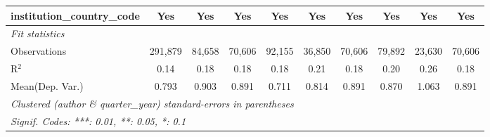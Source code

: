 \begin{tabular}{lccccccccc}
   institution\_country\_code             & Yes           & Yes           & Yes           & Yes           & Yes           & Yes           & Yes           & Yes           & Yes\\  
   \midrule
   \emph{Fit statistics}\\
   Observations                           & 291,879       & 84,658        & 70,606        & 92,155        & 36,850        & 70,606        & 79,892        & 23,630        & 70,606\\  
   R$^2$                                  & 0.14          & 0.18          & 0.18          & 0.18          & 0.21          & 0.18          & 0.20          & 0.26          & 0.18\\  
Mean(Dep. Var.) & 0.793 & 0.903 & 0.891 & 0.711 & 0.814 & 0.891 & 0.870 & 1.063 & 0.891 \\
   \midrule \midrule
   \multicolumn{10}{l}{\emph{Clustered (author \& quarter\_year) standard-errors in parentheses}}\\
   \multicolumn{10}{l}{\emph{Signif. Codes: ***: 0.01, **: 0.05, *: 0.1}}\\
\end{tabular}
\par\endgroup
